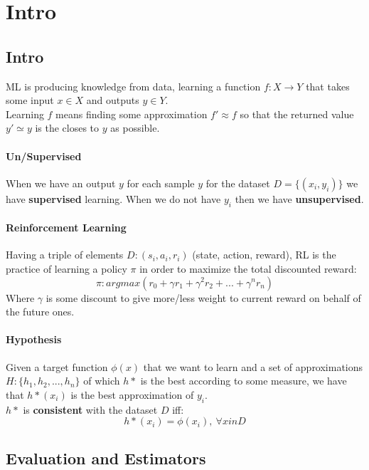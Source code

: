 
\newcommand{\braces}[1]{\lbrace{#1}\rbrace}


\section{Intro}
\subsection{Intro}
ML is producing knowledge from data, learning a function $f:X\rightarrow Y$ that takes some input $x \in X$ and outputs $y \in Y$.\\
Learning $f$ means finding some approximation $f' \approx f$ so that the returned value $y' \simeq y$ is the closes to $y$ as possible.\\

\paragraph{Un/Supervised}  When we have an output $y$ for each sample $y$ for the dataset $D=\lbrace (x_i,y_i)\rbrace$ we have \textbf{supervised } learning. When we do not have $y_i$ then we have \textbf{unsupervised}.

\paragraph{Reinforcement Learning}
Having a triple of elements $D: (s_i,a_i,r_i)$ (state, action, reward), RL is the practice of learning a policy $\pi$ in order to maximize the total discounted reward:
\[\pi: argmax(r_0+ \gamma r_1+ \gamma^2 r_2+...+\gamma^n r_n)\]
Where $\gamma$ is some discount to give more/less weight to current reward on behalf of the future ones.

\paragraph{Hypothesis}
Given a target function $\phi(x)$ that we want to learn and a set of approximations $H:\lbrace h_1, h_2,...,h_n\rbrace$ of which $h*$ is the best according to some measure, we have that $h*(x_i)$ is the best approximation of $y_i$.\\
$h*$ is \textbf{consistent} with the dataset $D$ iff:
$$h*(x_i)= \phi(x_i),\ \forall x in D$$

\subsection{Evaluation and Estimators}

